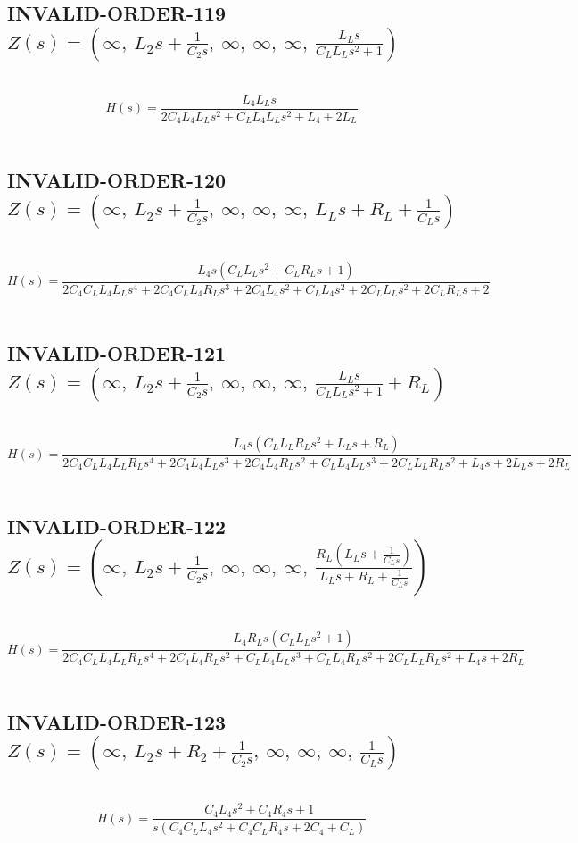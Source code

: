 \documentclass{article}
\begin{document}
\subsection{INVALID-ORDER-119 $Z(s) = \left( \infty, \  L_{2} s + \frac{1}{C_{2} s}, \  \infty, \  \infty, \  \infty, \  \frac{L_{L} s}{C_{L} L_{L} s^{2} + 1}\right)$ } \ 
\textbf{\[H(s) = \frac{L_{4} L_{L} s}{2 C_{4} L_{4} L_{L} s^{2} + C_{L} L_{4} L_{L} s^{2} + L_{4} + 2 L_{L}}\] } \ 
\subsection{INVALID-ORDER-120 $Z(s) = \left( \infty, \  L_{2} s + \frac{1}{C_{2} s}, \  \infty, \  \infty, \  \infty, \  L_{L} s + R_{L} + \frac{1}{C_{L} s}\right)$ } \ 
\textbf{\[H(s) = \frac{L_{4} s \left(C_{L} L_{L} s^{2} + C_{L} R_{L} s + 1\right)}{2 C_{4} C_{L} L_{4} L_{L} s^{4} + 2 C_{4} C_{L} L_{4} R_{L} s^{3} + 2 C_{4} L_{4} s^{2} + C_{L} L_{4} s^{2} + 2 C_{L} L_{L} s^{2} + 2 C_{L} R_{L} s + 2}\] } \ 
\subsection{INVALID-ORDER-121 $Z(s) = \left( \infty, \  L_{2} s + \frac{1}{C_{2} s}, \  \infty, \  \infty, \  \infty, \  \frac{L_{L} s}{C_{L} L_{L} s^{2} + 1} + R_{L}\right)$ } \ 
\textbf{\[H(s) = \frac{L_{4} s \left(C_{L} L_{L} R_{L} s^{2} + L_{L} s + R_{L}\right)}{2 C_{4} C_{L} L_{4} L_{L} R_{L} s^{4} + 2 C_{4} L_{4} L_{L} s^{3} + 2 C_{4} L_{4} R_{L} s^{2} + C_{L} L_{4} L_{L} s^{3} + 2 C_{L} L_{L} R_{L} s^{2} + L_{4} s + 2 L_{L} s + 2 R_{L}}\] } \ 
\subsection{INVALID-ORDER-122 $Z(s) = \left( \infty, \  L_{2} s + \frac{1}{C_{2} s}, \  \infty, \  \infty, \  \infty, \  \frac{R_{L} \left(L_{L} s + \frac{1}{C_{L} s}\right)}{L_{L} s + R_{L} + \frac{1}{C_{L} s}}\right)$ } \ 
\textbf{\[H(s) = \frac{L_{4} R_{L} s \left(C_{L} L_{L} s^{2} + 1\right)}{2 C_{4} C_{L} L_{4} L_{L} R_{L} s^{4} + 2 C_{4} L_{4} R_{L} s^{2} + C_{L} L_{4} L_{L} s^{3} + C_{L} L_{4} R_{L} s^{2} + 2 C_{L} L_{L} R_{L} s^{2} + L_{4} s + 2 R_{L}}\] } \ 
\subsection{INVALID-ORDER-123 $Z(s) = \left( \infty, \  L_{2} s + R_{2} + \frac{1}{C_{2} s}, \  \infty, \  \infty, \  \infty, \  \frac{1}{C_{L} s}\right)$ } \ 
\textbf{\[H(s) = \frac{C_{4} L_{4} s^{2} + C_{4} R_{4} s + 1}{s \left(C_{4} C_{L} L_{4} s^{2} + C_{4} C_{L} R_{4} s + 2 C_{4} + C_{L}\right)}\] } \ 
\end{document}
